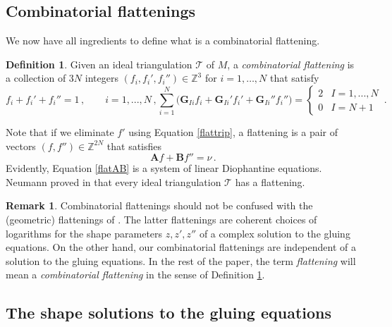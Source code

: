 \documentclass[12pt]{amsart}
\newcommand{\lbl}{\label}
\renewcommand{\eta}{\nu}
\theoremstyle{definition}
\newtheorem{definition}[theorem]{Definition}
\newtheorem{remark}[theorem]{Remark}
\def\BZ{\mathbb Z}
\def\calT{\mathcal T}
\def\be{  \begin{equation} }
\def\ee{  \end{equation} }
\newcommand{\CT}{\mathcal{T}}
\newcommand{\mb}{\mathbf}
\numberwithin{equation}{section}
\begin{document}
\subsection{Combinatorial flattenings}
\lbl{sub.flat}

We now have all ingredients to define what is a combinatorial flattening.

\begin{definition}
\lbl{def.flattening}
Given an ideal triangulation $\calT$ of $M$, a {\em combinatorial flattening} 
is a collection of $3N$ integers $(f_i,f_i',f_i'') \in \BZ^3$ for $i=1,\dots,N$
that satisfy
%
\begin{subequations}
%
\be f_i+f_i'+f_i'' = 1\,,\qquad i=1,...,N\,, \lbl{flattrip} \ee
%
\be \label{flatG} 
\sum_{i=1}^N \big(\mb{G}_{Ii}f_i+\mb{G}_{Ii}'f_i'+\mb{G}_{Ii}''f_i''\big) 
= \begin{cases} 2 & I=1,...,N \\
0 & I=N+1 \end{cases} \,.
\ee
%
\end{subequations}
%
\end{definition}
Note that if we eliminate $f'$ using Equation \eqref{flattrip}, a flattening
is a pair of vectors $(f,f'') \in \BZ^{2N}$ that satisfies
%
\be 
\label{flatAB} \mb A f+\mb B f'' = \eta\,. 
\ee
Evidently, Equation \eqref{flatAB} is a system of linear Diophantine equations.
Neumann proved in \cite[Lem.6.1]{Neumann-combi} that every ideal triangulation
$\CT$ has a flattening.

\begin{remark}
\lbl{rem.Nflattening}
Combinatorial flattenings should not be confused with the (geometric)
flattenings of \cite[Defn.3.1]{N}. The latter flattenings are
coherent choices of logarithms for the shape parameters $z,z',z''$ of a 
complex solution to the gluing equations. On the other hand, our 
combinatorial flattenings are independent of a solution to the gluing 
equations. In the rest of the paper, the term {\em flattening} will mean
a {\em combinatorial flattening} in the sense of Definition 
\ref{def.flattening}.
\end{remark}

\subsection{The shape solutions to the gluing equations}
\lbl{sub.shapesol}
\end{document}
